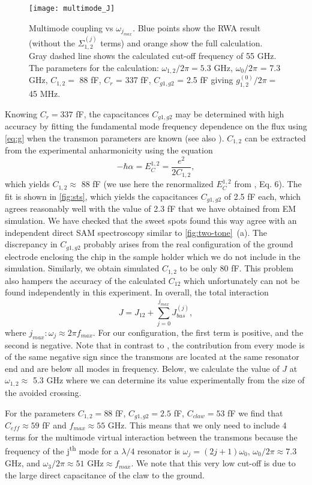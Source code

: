 \documentclass[%
 aps, prx,
 amsmath,amssymb,
 reprint,%
superscriptaddress
]{revtex4-2}
\begin{document}
\begin{figure}[b]
	\texttt{[image: multimode\_J]}
	\caption{Multimode coupling vs $\omega_{j_{max}}$. Blue points show the RWA result (without the $\Sigma_{1,2}^{(j)}$ terms) and orange show the full calculation. Gray dashed line shows the calculated cut-off frequency of 55 GHz. The parameters for the calculation: $\omega_{1,2}/2\pi = 5.3$ GHz, $\omega_0/2\pi$ = 7.3 GHz, $C_{1,2} = $ 88 fF, $ C_r $ = 337 fF, $C_{g1,g2}$ = 2.5 fF giving $ g_{1,2}^{(0)}/2\pi = $ 45 MHz.}
	\label{fig:Jbus}
\end{figure}

Knowing	$C_r = 337$ fF, the capacitances $C_{g1, g2}$ may be determined with high accuracy by fitting the fundamental mode frequency dependence on the flux using \autoref{eq:g} when the transmon parameters are known (see also \cite{fedorov2019automated}). $C_{1,2}$ can be extracted from the experimental anharmonicity using the equation
\[
-\hbar \alpha = E_{C}^{1,2} = \frac{e^2}{2 C_{1,2}},
\]
which yields $C_{1,2}\approx$ 88 fF (we use here the renormalized $ E_{C}^{1,2} $ from \cite{gely2017convergence}, Eq. 6). The fit is shown in \autoref{fig:sts}, which yields the capacitances $C_{g1, g2}$ of 2.5 fF each, which agrees reasonably well with the value of 2.3 fF that we have obtained from EM simulation. We have checked that the sweet spots found this way agree with an independent direct SAM spectroscopy similar to \autoref{fig:two-tone}~(a). The discrepancy in $C_{g1,g2}$ probably arises from the real configuration of the ground electrode enclosing the chip in the sample holder which we do not include in the simulation. Similarly, we obtain simulated $C_{1,2}$ to be only 80 fF. This problem also hampers the accuracy of the calculated $C_{12}$ which unfortunately can not be found independently in this experiment. In overall, the total interaction 
\[
J = J_{12} + \sum_{j=0}^{j_{max}} J^{(j)}_{bus},
\]
where $j_{max}: \omega_j \approx 2\pi f_{max}$. For our configuration, the first term is positive, and the second is negative. Note that in contrast to \cite{filipp2011multimode}, the contribution from every mode is of the same negative sign since the transmons are located at the same resonator end and are below all modes in frequency. Below, we calculate the value of $J$ at $\omega_{1,2} \approx$ 5.3 GHz where we can determine its value experimentally from the size of the avoided crossing.

For the parameters $C_{1,2} = 88$ fF, $C_{g1, g2} = 2.5$ fF, $C_{claw} = 53$ fF we find that $C_{eff} \approx 59$ fF and $f_{max} \approx 55$ GHz. This means that we only need to include 4 terms for the multimode virtual interaction between the transmons because the frequency of the j\textsuperscript{th} mode for a $\lambda/4$ resonator is $\omega_j = (2j+1)\omega_0$, $\omega_0/2\pi \approx 7.3$ GHz, and $\omega_3/2\pi \approx 51 \text{ GHz} \approx f_{max}$. We note that this very low cut-off is due to the large direct capacitance of the claw to the ground.
\end{document}

